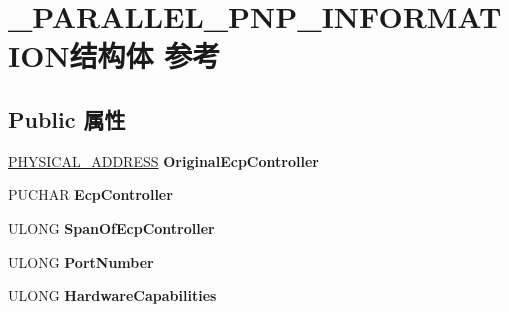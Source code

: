 \hypertarget{struct___p_a_r_a_l_l_e_l___p_n_p___i_n_f_o_r_m_a_t_i_o_n}{}\section{\+\_\+\+P\+A\+R\+A\+L\+L\+E\+L\+\_\+\+P\+N\+P\+\_\+\+I\+N\+F\+O\+R\+M\+A\+T\+I\+O\+N结构体 参考}
\label{struct___p_a_r_a_l_l_e_l___p_n_p___i_n_f_o_r_m_a_t_i_o_n}
\subsection*{Public 属性}
\begin{DoxyCompactItemize}
\item 
\mbox{\label{struct___p_a_r_a_l_l_e_l___p_n_p___i_n_f_o_r_m_a_t_i_o_n_ac8888f5cb9f1b3398f7fa753d35a453e}} 
\hyperlink{union___l_a_r_g_e___i_n_t_e_g_e_r}{P\+H\+Y\+S\+I\+C\+A\+L\+\_\+\+A\+D\+D\+R\+E\+SS} {\bfseries Original\+Ecp\+Controller}
\item 
\mbox{\label{struct___p_a_r_a_l_l_e_l___p_n_p___i_n_f_o_r_m_a_t_i_o_n_ab2cd042e2b844ec4d1bfd60221c6cfdc}} 
P\+U\+C\+H\+AR {\bfseries Ecp\+Controller}
\item 
\mbox{\label{struct___p_a_r_a_l_l_e_l___p_n_p___i_n_f_o_r_m_a_t_i_o_n_a1b1093a309f25031e82dea14b51129b0}} 
U\+L\+O\+NG {\bfseries Span\+Of\+Ecp\+Controller}
\item 
\mbox{\label{struct___p_a_r_a_l_l_e_l___p_n_p___i_n_f_o_r_m_a_t_i_o_n_a7c7ef4e77c86beb2a5bf18177b1125df}} 
U\+L\+O\+NG {\bfseries Port\+Number}
\item 
\mbox{\label{struct___p_a_r_a_l_l_e_l___p_n_p___i_n_f_o_r_m_a_t_i_o_n_a0ab046ef56c24be1fb2ec1b58f99f73e}} 
U\+L\+O\+NG {\bfseries Hardware\+Capabilities}
\item 
\mbox{\label{struct___p_a_r_a_l_l_e_l___p_n_p___i_n_f_o_r_m_a_t_i_o_n_af2f1fb57f4690a6e3c31decf170c8c43}} 

\end{DoxyCompactItemize}
